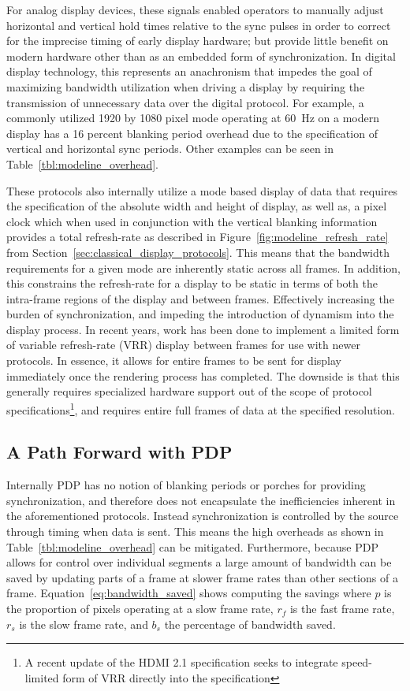         For analog display devices, these signals enabled operators to manually adjust horizontal and vertical hold times relative to the sync pulses in order to correct for the imprecise timing of early display hardware; but provide little benefit on modern hardware other than as an embedded form of synchronization. In digital display technology, this represents an anachronism that impedes the goal of maximizing bandwidth utilization when driving a display by requiring the transmission of unnecessary data over the digital protocol. For example, a commonly utilized 1920 by 1080 pixel mode operating at \mbox{60 Hz}\cite{MythTVWebsite} on a modern display has a 16 percent blanking period overhead due to the specification of vertical and horizontal sync periods. Other examples can be seen in Table~\ref{tbl:modeline_overhead}.

        These protocols also internally utilize a mode based display of data that requires the specification of the absolute width and height of display, as well as, a pixel clock which when used in conjunction with the vertical blanking information provides a total refresh-rate as described in Figure~\ref{fig:modeline_refresh_rate} from Section~\ref{sec:classical_display_protocols}. This means that the bandwidth requirements for a given mode are inherently static across all frames. In addition, this constrains the refresh-rate for a display to be static in terms of both the intra-frame regions of the display and between frames. Effectively increasing the burden of synchronization, and impeding the introduction of dynamism into the display process. In recent years, work has been done to implement a limited form of variable refresh-rate (VRR) display between frames for use with newer protocols\cite{AMDFreesync,NVIDIAGsync}. In essence, it allows for entire frames to be sent for display immediately once the rendering process has completed. The downside is that this generally requires specialized hardware support out of the scope of protocol specifications\footnote{A recent update of the HDMI 2.1 specification\cite{HDMIForum2018} seeks to integrate speed-limited form of VRR directly into the specification}, and requires entire full frames of data at the specified resolution.

    \subsection{A Path Forward with PDP}
        Internally PDP has no notion of blanking periods or porches for providing synchronization, and therefore does not encapsulate the inefficiencies inherent in the aforementioned protocols. Instead synchronization is controlled by the source through timing when data is sent. This means the high overheads as shown in Table~\ref{tbl:modeline_overhead} can be mitigated. Furthermore, because PDP allows for control over individual segments a large amount of bandwidth can be saved by updating parts of a frame at slower frame rates than other sections of a frame. Equation~\eqref{eq:bandwidth_saved} shows computing the savings where $p$ is the proportion of pixels operating at a slow frame rate, $r_f$ is the fast frame rate, $r_s$ is the slow frame rate, and $b_s$ the percentage of bandwidth saved.

